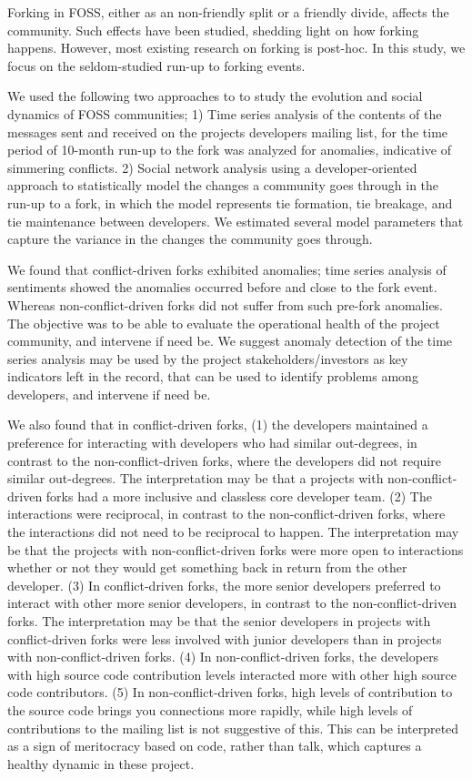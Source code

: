 \documentclass[12pt]{report}
\begin{document}
Forking in FOSS, either as an non-friendly split or a friendly divide, affects the community. Such effects have been studied, shedding light on how forking happens. However, most existing research on forking is post-hoc. In this study, we focus on the seldom-studied run-up to forking events. 

We used the following two approaches to to study the evolution and social dynamics of FOSS communities; 1) Time series analysis of the contents of the messages sent and received on the projects developers mailing list, for the time period of 10-month run-up to the fork was analyzed for anomalies, indicative of simmering conflicts. 2) Social network analysis using a developer-oriented approach to statistically model the changes a community goes through in the run-up to a fork, in which the model represents tie formation, tie breakage, and tie maintenance between developers. We estimated several model parameters that capture the variance in the changes the community goes through. 

We found that conflict-driven forks exhibited anomalies; time series analysis of sentiments showed the anomalies occurred before and close to the fork event. Whereas non-conflict-driven forks did not suffer from such pre-fork anomalies. The objective was to be able to evaluate the operational health of the project community, and intervene if need be. We suggest anomaly detection of the time series analysis may be used by the project stakeholders/investors as key indicators left in the record, that can be used to identify problems among developers, and intervene if need be.

We also found that in conflict-driven forks, (1) the developers maintained a preference for interacting with developers who had similar out-degrees, in contrast to the non-conflict-driven forks, where the developers did not require similar out-degrees. The interpretation may be that a projects with non-conflict-driven forks had a more inclusive and classless core developer team. (2) The interactions were reciprocal, in contrast to the non-conflict-driven forks, where the interactions did not need to be reciprocal to happen. The interpretation may be that the projects with non-conflict-driven forks were more open to interactions whether or not they would get something back in return from the other developer. (3) In conflict-driven forks, the more senior developers preferred to interact with other more senior developers, in contrast to the non-conflict-driven forks. The interpretation may be that the senior developers in projects with conflict-driven forks were less involved with junior developers than in projects with non-conflict-driven forks. (4) In non-conflict-driven forks, the developers with high source code contribution levels interacted more with other high source code contributors. (5) In non-conflict-driven forks, high levels of contribution to the source code brings you connections more rapidly, while high levels of contributions to the mailing list is not suggestive of this. This can be interpreted as a sign of meritocracy based on code, rather than talk, which captures a healthy dynamic in these project.
\end{document}
